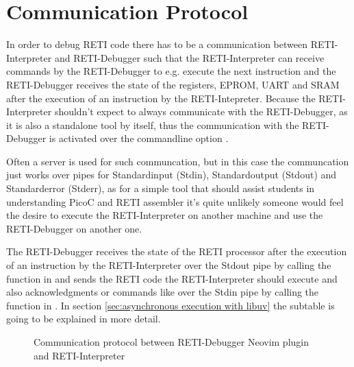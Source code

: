 \documentclass{report}
\begin{document}

\section{Communication Protocol}
\label{sec:communication protocol}


\sloppy

In order to debug RETI code there has to be a communication between RETI-Interpreter and RETI-Debugger such that the RETI-Interpreter can receive commands by the RETI-Debugger to e.g. execute the next instruction and the RETI-Debugger receives the state of the registers, EPROM, UART and SRAM after the execution of an instruction by the RETI-Intepreter. Because the RETI-Interpreter shouldn't expect to always communicate with the RETI-Debugger, as it is also a standalone tool by itself, thus the communication with the RETI-Debugger is activated over the commandline option .

Often a server is used for such communcation, but in this case the communcation just works over \alert{pipes} for Standardinput (\alert{Stdin}), Standardoutput (\alert{Stdout}) and Standarderror (\alert{Stderr}), as for a simple tool that should assist students in understanding PicoC and RETI assembler it's quite unlikely someone would feel the desire to execute the RETI-Interpreter on another machine and use the RETI-Debugger on another one.

The RETI-Debugger receives the state of the RETI processor after the execution of an instruction by the RETI-Interpreter over the Stdout pipe by calling the  function in  and sends the RETI code the RETI-Interpreter should execute and also acknowledgments or commands like  over the Stdin pipe by calling the  function in . In section \ref{sec:asynchronous execution with libuv}  the subtable  is going to be explained in more detail.

\begin{figure}
	\centering
	\caption{Communication protocol between RETI-Debugger Neovim plugin and RETI-Interpreter}
	\label{fig:communication reti debugger and reti interpreter}
\end{figure}
\end{document}
